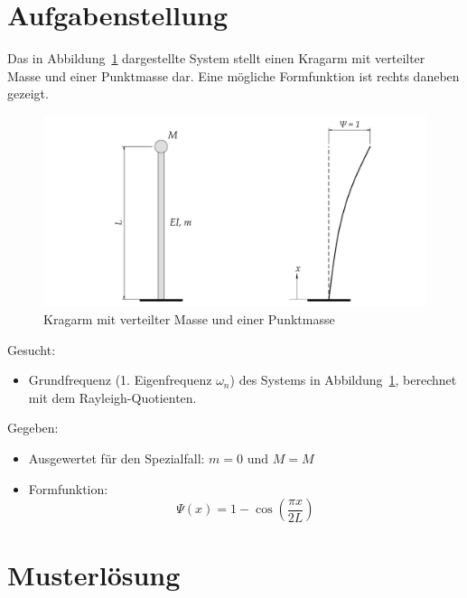 \documentclass[
  letterpaper,
  DIV=11]{scrreprt}
\providecommand{\tightlist}{%
  \setlength{\itemsep}{0pt}\setlength{\parskip}{0pt}}\usepackage{longtable,booktabs,array}
\begin{document}
\hypertarget{aufgabenstellung-1}{%
\section{Aufgabenstellung}\label{aufgabenstellung-1}}

Das in Abbildung~\ref{fig-kragarm_1_punkte} dargestellte System stellt
einen Kragarm mit verteilter Masse und einer Punktmasse dar. Eine
mögliche Formfunktion ist rechts daneben gezeigt.

\begin{figure}[H]

{\centering \includegraphics{index_files/mediabag/bilder/aufgabe_rayleigh_1_masse.pdf}

}

\caption{\label{fig-kragarm_1_punkte}Kragarm mit verteilter Masse und
einer Punktmasse}

\end{figure}

Gesucht:

\begin{itemize}
\tightlist
\item
  Grundfrequenz (1. Eigenfrequenz \(\omega_n\)) des Systems in
  Abbildung~\ref{fig-kragarm_1_punkte}, berechnet mit dem
  Rayleigh-Quotienten.
\end{itemize}

Gegeben:

\begin{itemize}
\tightlist
\item
  Ausgewertet für den Spezialfall: \(m = 0 \text{ und } M = M\)
\item
  Formfunktion: \[ \Psi(x) = 1 - \cos(\frac{\pi x}{2L})\]
\end{itemize}

\newpage{}

\hypertarget{musterluxf6sung}{%
\section{Musterlösung}\label{musterluxf6sung}}
\end{document}
